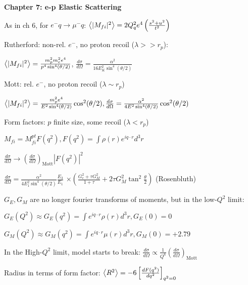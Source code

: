 \textbf{Chapter 7: e-p Elastic Scattering}

As in ch 6, for $e^- q \to \mu^- q$: $\expval{|M_{fi}|^2} = 2Q_q^2 e^4 \left(\frac{s^2+u^2}{t^2}\right)$

Rutherford: non-rel. $e^-$, no proton recoil ($\lambda >> r_p$):

$\expval{|M_{fi}|^2} = \frac{m_p^2 m_e^2 e^4}{p^4 \sin^4(\theta/2)}$, $\frac{d\sigma}{d\Omega} = \frac{\alpha^2}{16 E_K^2 \sin^4(\theta/2)}$

Mott: rel. $e^-$, no proton recoil ($\lambda \sim r_p$)

$\expval{|M_{fi}|^2} = \frac{m_p^2 e^4}{E^2 \sin^4(\theta/2)}\cos^2(\theta/2), 
\frac{d\sigma}{d\Omega} = \frac{\alpha^2}{4 E^2 \sin^4(\theta/2)}\cos^2(\theta/2)$

Form factors: $p$ finite size, some recoil ($\lambda < r_p$)

$M_{fi} = M_{fi}^{pt}F(q^2), F(q^2) = \int \rho(r)e^{iq\cdot r} d^3r$

$\frac{d\sigma}{d\Omega} \to \left(\frac{d\sigma}{d\Omega}\right)_{\text{Mott}}|F(q^2)|^2$

$\frac{d\sigma}{d\Omega} = \frac{\alpha^2}{4E_1^2\sin^4(\theta/2)}\frac{E_3}{E_1}$
$\times \left(\frac{G_e^2 + \tau G_M^2}{1+\tau} + 2\tau G_M^2 \tan^2 \frac{\theta}{2}\right)$
(Rosenbluth)

$G_E, G_M$ are no longer fourier transforms of moments, but in the low-$Q^2$ limit:

$G_E(Q^2) \approx G_E(q^2) = \int e^{iq \cdot r} \rho(r)d^3r, G_E(0)=0$

$G_M(Q^2) \approx G_M(q^2) = \int e^{iq \cdot r} \mu(r)d^3r, G_M(0)=+2.79$

In the High-$Q^2$ limit, model starts to break: $\frac{d\sigma}{d\Omega} \propto \frac{1}{Q^6}\left(\frac{d\sigma}{d\Omega}\right)_{\text{Mott}}$

Radius in terms of form factor: $\expval{R^2} = -6 \left[\frac{dF(q^2)}{dq^2}\right]_{q^2=0}$
